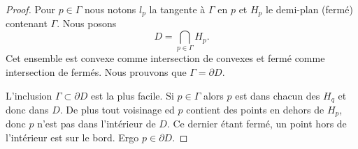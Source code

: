 \begin{proof}
    Pour \( p\in \Gamma\) nous notons \( l_p\) la tangente à \( \Gamma\) en \( p\) et \( H_p\) le demi-plan (fermé) contenant \( \Gamma\). Nous posons
    \begin{equation}        \label{EQooDYFTooCHRbsD}
        D=\bigcap_{p\in \Gamma}H_p.
    \end{equation}
    Cet ensemble est convexe comme intersection de convexes et fermé comme intersection de fermés. Nous prouvons que \( \Gamma=\partial D\). 


    L'inclusion \( \Gamma\subset\partial D\) est la plus facile. Si \( p\in \Gamma\) alors \( p\) est dans chacun des \( H_q\) et donc dans \( D\). De plus tout voisinage ed \( p\) contient des points en dehors de \( H_p\), donc \( p\) n'est pas dans l'intérieur de \( D\). Ce dernier étant fermé, un point hors de l'intérieur est sur le bord. Ergo \( p\in\partial D\).


\end{proof}

